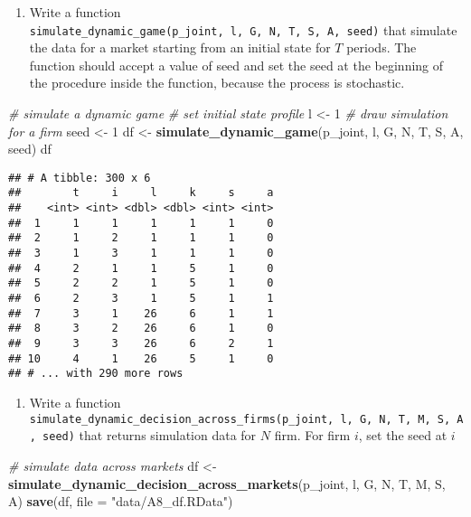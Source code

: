 \documentclass[
]{book}
\newenvironment{Shaded}{\begin{snugshade}}{\end{snugshade}}
\newcommand{\CommentTok}[1]{\textcolor[rgb]{0.56,0.35,0.01}{\textit{#1}}}
\newcommand{\DataTypeTok}[1]{\textcolor[rgb]{0.13,0.29,0.53}{#1}}
\newcommand{\DecValTok}[1]{\textcolor[rgb]{0.00,0.00,0.81}{#1}}
\newcommand{\KeywordTok}[1]{\textcolor[rgb]{0.13,0.29,0.53}{\textbf{#1}}}
\newcommand{\NormalTok}[1]{#1}
\newcommand{\StringTok}[1]{\textcolor[rgb]{0.31,0.60,0.02}{#1}}
\providecommand{\tightlist}{%
  \setlength{\itemsep}{0pt}\setlength{\parskip}{0pt}}
\begin{document}
\begin{enumerate}
\def\labelenumi{\arabic{enumi}.}
\setcounter{enumi}{11}
\tightlist
\item
  Write a function \texttt{simulate\_dynamic\_game(p\_joint,\ l,\ G,\ N,\ T,\ S,\ A,\ seed)} that simulate the data for a market starting from an initial state for \(T\) periods. The function should accept a value of seed and set the seed at the beginning of the procedure inside the function, because the process is stochastic.
\end{enumerate}

\begin{Shaded}
\begin{Highlighting}[]
\CommentTok{# simulate a dynamic game}
\CommentTok{# set initial state profile}
\NormalTok{l <-}\StringTok{ }\DecValTok{1}
\CommentTok{# draw simulation for a firm}
\NormalTok{seed <-}\StringTok{ }\DecValTok{1}
\NormalTok{df <-}\StringTok{ }\KeywordTok{simulate_dynamic_game}\NormalTok{(p_joint, l, G, N, T, S, A, seed)}
\NormalTok{df}
\end{Highlighting}
\end{Shaded}

\begin{verbatim}
## # A tibble: 300 x 6
##        t     i     l     k     s     a
##    <int> <int> <dbl> <dbl> <int> <int>
##  1     1     1     1     1     1     0
##  2     1     2     1     1     1     0
##  3     1     3     1     1     1     0
##  4     2     1     1     5     1     0
##  5     2     2     1     5     1     0
##  6     2     3     1     5     1     1
##  7     3     1    26     6     1     1
##  8     3     2    26     6     1     0
##  9     3     3    26     6     2     1
## 10     4     1    26     5     1     0
## # ... with 290 more rows
\end{verbatim}

\begin{enumerate}
\def\labelenumi{\arabic{enumi}.}
\setcounter{enumi}{12}
\tightlist
\item
  Write a function \texttt{simulate\_dynamic\_decision\_across\_firms(p\_joint,\ l,\ G,\ N,\ T,\ M,\ S,\ A,\ seed)} that returns simulation data for \(N\) firm. For firm \(i\), set the seed at \(i\)
\end{enumerate}

\begin{Shaded}
\begin{Highlighting}[]
\CommentTok{# simulate data across markets}
\NormalTok{df <-}\StringTok{ }\KeywordTok{simulate_dynamic_decision_across_markets}\NormalTok{(p_joint, l, G, N, T, M, S, A)}
\KeywordTok{save}\NormalTok{(df, }\DataTypeTok{file =} \StringTok{"data/A8_df.RData"}\NormalTok{)}
\end{Highlighting}
\end{Shaded}
\end{document}
